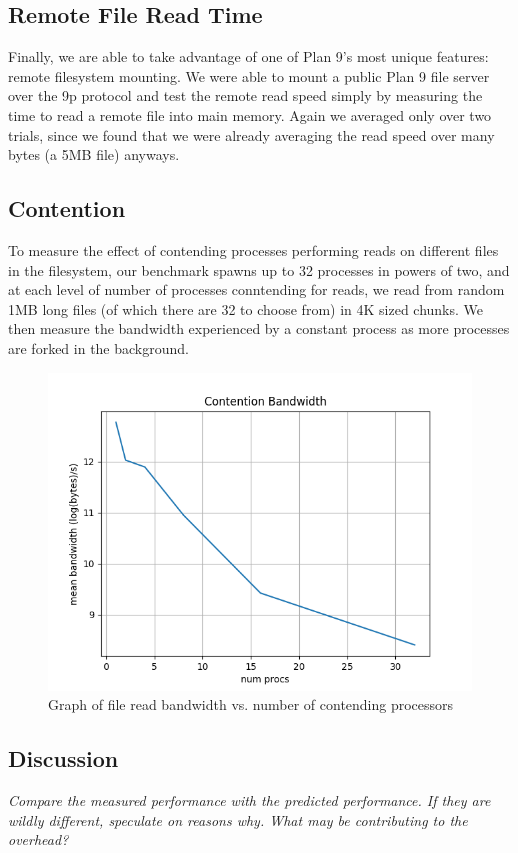 \documentclass[letterpaper,twocolumn,10pt]{article}
\begin{document}
\subsection{Remote File Read Time}
Finally, we are able to take advantage of one of Plan 9's most unique features:
remote filesystem mounting. We were able to mount a public Plan 9 file server
over the 9p protocol and test the remote read speed simply by measuring the
time to read a remote file into main memory. Again we averaged only over two
trials, since we found that we were already averaging the read speed over many
bytes (a 5MB file) anyways.

\subsection{Contention}
To measure the effect of contending processes performing reads on different
files in the filesystem, our benchmark spawns up to 32 processes in powers of
two, and at each level of number of processes conntending for reads, we read
from random 1MB long files (of which there are 32 to choose from) in 4K sized 
chunks. We then measure the bandwidth experienced by a constant process as more
processes are forked in the background.

\begin{figure}
	\centering
	\includegraphics{graphs/contention}
  \caption{Graph of file read bandwidth vs. number of contending processors}
	\label{fig:filecache}
\end{figure}

\subsection{Discussion}
\textit{Compare the measured performance with the predicted performance. If they are wildly different, speculate on reasons why. What may be contributing to the overhead?}
\end{document}
